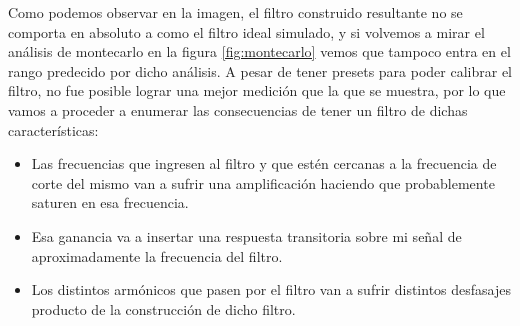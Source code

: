 \documentclass[../../ASSD_TP1_G7.tex]{subfiles}
\begin{document}
Como podemos observar en la imagen, el filtro construido resultante no se comporta en absoluto a como el filtro ideal simulado, y si volvemos a mirar el análisis de montecarlo en la figura \ref{fig:montecarlo} vemos que tampoco entra en el rango predecido por dicho análisis. A pesar de tener presets para poder calibrar el filtro, no fue posible lograr una mejor medición que la que se muestra, por lo que vamos a proceder a enumerar las consecuencias de tener un filtro de dichas características:
\begin{itemize}
\item Las frecuencias que ingresen al filtro y que estén cercanas a la frecuencia de corte del mismo van a sufrir una amplificación haciendo que probablemente saturen en esa frecuencia.


\item Esa ganancia va a insertar una respuesta transitoria sobre mi señal de aproximadamente la frecuencia del filtro.

\item Los distintos armónicos que pasen por el filtro van a sufrir distintos desfasajes producto de la construcción de dicho filtro.
\end{itemize}
\end{document}
